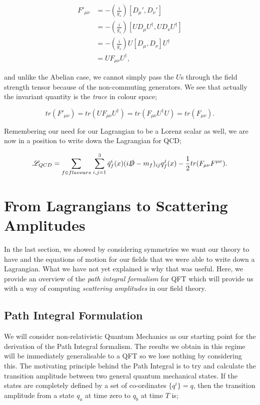 \begin{equation}
\begin{split}
F'_{\mu \nu} &= -\left(\frac{i}{g_s} \right) [D_\mu', D_\nu'] \\
&= -\left(\frac{i}{g_s} \right) [U D_\mu U^\dagger, U D_\nu U^\dagger] \\
&= -\left(\frac{i}{g_s} \right) U [D_\mu, D_\nu]  U^\dagger \\
&=  U F_{\mu \nu}  U^\dagger,
\end{split}
\end{equation}

and unlike the Abelian case, we cannot simply pass the $U$s through the field strength tensor because of the non-commuting generators. We see that actually the invariant quantity is the \emph{trace} in colour space;

\begin{equation}
tr(F'_{\mu \nu}) = tr(U F_{\mu \nu} U^\dagger) = tr(F_{\mu \nu}U^\dagger U) = tr(F_{\mu \nu}).
\end{equation}

Remembering our need for our Lagrangian to be a Lorenz scalar as well, we are now in a position to write down the Lagrangian for QCD;

\begin{equation}
\mathscr{L}_{QCD} = \sum_{f \in flavours} \hspace{1pt} \sum_{i,j = 1}^3 \bar{q}_f^i(x)(i \slashed{D} - m_f)_{ij}q^j_f(x) - \frac{1}{2}tr(F_{\mu \nu}F^{\mu \nu}).
\end{equation}

\section{From Lagrangians to Scattering Amplitudes}

In the last section, we showed by considering symmetries we want our theory to have and the equations of motion for our fields that we were able to write down a Lagrangian. What we have not yet explained is why that was useful. Here, we provide an overview of the \emph{path integral formalism} for QFT which will provide us with a way of computing \emph{scattering amplitudes} in our field theory. 

\subsection{Path Integral Formulation}

We will consider non-relativistic Quantum Mechanics as our starting point for the derivation of the Path Integral formalism. The results we obtain in this regime will be immediately generalisable to a QFT so we lose nothing by considering this. The motivating principle behind the Path Integral is to try and calculate the transition amplitude between two general quantum mechanical states. If the states are completely defined by a set of co-ordinates $\{q^i\} = q$, then the transition amplitude from a state $q_a$ at time zero to $q_b$ at time $T$ is;


